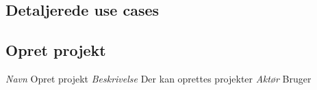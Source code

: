 


\subsection{Detaljerede use cases}
\subsection{Opret projekt}
\emph{Navn}\newline
Opret projekt\newline
\emph{Beskrivelse}\newline
Der kan oprettes projekter\newline
\emph{Aktør}\newline
Bruger

